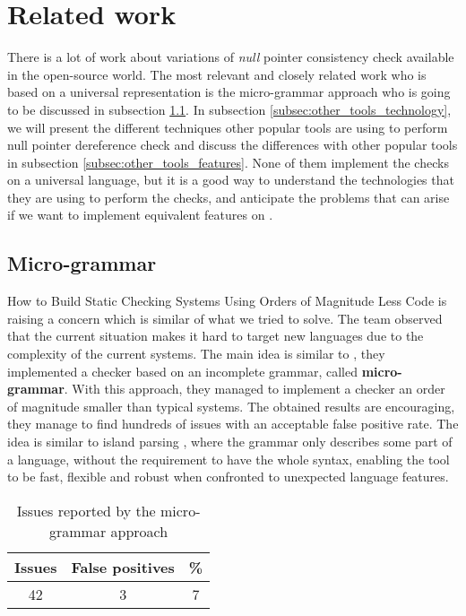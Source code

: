 \section{Related work}
\label{sec:related_work}

There is a lot of work about variations of \emph{null} pointer consistency check available in the open-source world.
The most relevant and closely related work who is based on a universal representation is the micro-grammar approach \cite{Brown:2016:BSC:2954679.2872364} who is going to be discussed in subsection \ref{subsec:micro_grammar}.
In subsection \ref{subsec:other_tools_technology}, we will present the different techniques other popular tools are using to perform null pointer dereference check and discuss the differences with other popular tools in subsection \ref{subsec:other_tools_features}.
None of them implement the checks on a universal language, but it is a good way to understand the technologies that they are using to perform the checks, and anticipate the problems that can arise if we want to implement equivalent features on \slang{}.

\subsection{Micro-grammar}
\label{subsec:micro_grammar}

How to Build Static Checking Systems Using Orders of Magnitude Less Code \cite{Brown:2016:BSC:2954679.2872364} is raising a concern which is similar of what we tried to solve. 
The team observed that the current situation makes it hard to target new languages due to the complexity of the current systems. 
The main idea is similar to \slang{}, they implemented a checker based on an incomplete grammar, called \textbf{micro-grammar}.
With this approach, they managed to implement a checker an order of magnitude smaller than typical systems.
The obtained results are encouraging, they manage to find hundreds of issues with an acceptable false positive rate. 
The idea is similar to island parsing \cite{Moonen:2001}, where the grammar only describes some part of a language, without the requirement to have the whole syntax, enabling the tool to be fast, flexible and robust when confronted to unexpected language features.

\begin{table}[h]
	\centering
	\caption{Issues reported by the micro-grammar approach}
	\label{table:micro_grammar_issues}
	\begin{tabular}{|c|c|c|}
		\hline
		\bf Issues & \bf False positives & \bf \% \\ \hline
		42 &  3 &  7 \\ \hline
	\end{tabular}
\end{table}

